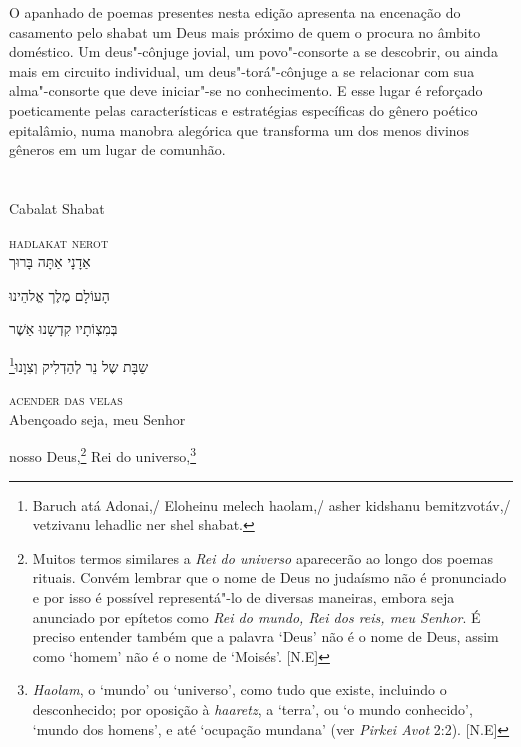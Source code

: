 O apanhado de poemas presentes nesta edição apresenta na encenação do
casamento pelo shabat um Deus mais próximo de quem o procura no âmbito
doméstico. Um deus"-cônjuge jovial, um povo"-consorte a se descobrir, ou
ainda mais em circuito individual, um deus"-torá"-cônjuge a se relacionar
com sua alma"-consorte que deve iniciar"-se no conhecimento. E esse lugar
é reforçado poeticamente pelas características e estratégias específicas
do gênero poético epitalâmio, numa manobra alegórica que transforma um
dos menos divinos gêneros em um lugar de comunhão.



\chapter*{}
\begin{center}
\begin{vplace}[0.3]
\Large
Cabalat Shabat
\end{vplace}
\end{center}
\thispagestyle{empty}


\movetoevenpage
\raggedleft



\textsc{hadlakat nerot}\\[15pt]

אַדָנָי אַתָּה בָּרוּך

הָעוֹלָם מֶלֶך אֱלהֵינוּ

בְּמִצְוֹתָיו קִדְשָנוּ אַשֶׁר

\footnote{Baruch atá Adonai,/ Eloheinu melech haolam,/ asher kidshanu bemitzvotáv,/ vetzivanu lehadlic ner shel shabat.}שַבָּת שֶל נֵר לְהַדְלִיק וְצִוָנוּ‏

\movetooddpage
\raggedright

\textsc{acender das velas}\\[15pt]

Abençoado seja, meu Senhor

nosso Deus,\footnote{
		Muitos termos similares a \textit{Rei do universo} aparecerão
		ao longo dos poemas rituais. Convém lembrar que o nome de Deus
		no judaísmo não é pronunciado e por isso é possível
		representá"-lo de diversas maneiras, embora seja anunciado por
		epítetos como \textit{Rei do mundo, Rei dos reis, meu Senhor}.
		É preciso entender também que a palavra `Deus' não é o nome de
		Deus, assim como `homem' não é o nome de `Moisés'. [N.E]} 
Rei do universo,\footnote{\textit{Haolam}, o `mundo' ou `universo', como tudo
		que existe, incluindo o desconhecido; por oposição à \textit{haaretz},
		a `terra', ou `o mundo conhecido', `mundo dos homens', e até `ocupação
		mundana' (ver \textit{Pirkei Avot} 2:2). [N.E]}

